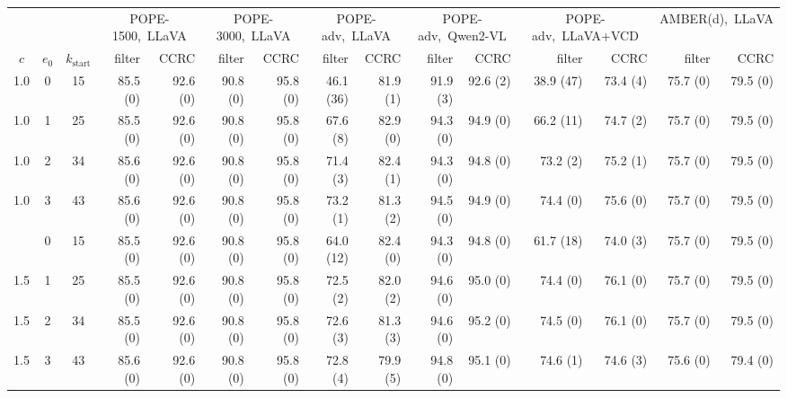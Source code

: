 \begin{tabular}{cccrrrrrrrrrrrr}
\toprule
 & & & \multicolumn{2}{c}{POPE-1500,~LLaVA} & \multicolumn{2}{c}{POPE-3000,~LLaVA} & \multicolumn{2}{c}{POPE-adv,~LLaVA} & \multicolumn{2}{c}{POPE-adv,~Qwen2-VL} & \multicolumn{2}{c}{POPE-adv,~LLaVA+VCD} & \multicolumn{2}{c}{AMBER(d),~LLaVA}\\
\cmidrule(lr){4-5}\cmidrule(lr){6-7}\cmidrule(lr){8-9}\cmidrule(lr){10-11}\cmidrule(lr){12-13}\cmidrule(lr){14-15}
$c$ & $e_0$ & $k_{\mathrm{start}}$ & filter & CCRC & filter & CCRC & filter & CCRC & filter & CCRC & filter & CCRC & filter & CCRC\\
\midrule
1.0 & 0 & 15 & 85.5 (0) & 92.6 (0) & 90.8 (0) & 95.8 (0) & 46.1 (36) & 81.9 (1) & 91.9 (3) & 92.6 (2) & 38.9 (47) & 73.4 (4) & 75.7 (0) & 79.5 (0)\\
1.0 & 1 & 25 & 85.5 (0) & 92.6 (0) & 90.8 (0) & 95.8 (0) & 67.6 (8) & 82.9 (0) & 94.3 (0) & 94.9 (0) & 66.2 (11) & 74.7 (2) & 75.7 (0) & 79.5 (0)\\
1.0 & 2 & 34 & 85.6 (0) & 92.6 (0) & 90.8 (0) & 95.8 (0) & 71.4 (3) & 82.4 (1) & 94.3 (0) & 94.8 (0) & 73.2 (2) & 75.2 (1) & 75.7 (0) & 79.5 (0)\\
1.0 & 3 & 43 & 85.6 (0) & 92.6 (0) & 90.8 (0) & 95.8 (0) & 73.2 (1) & 81.3 (2) & 94.5 (0) & 94.9 (0) & 74.4 (0) & 75.6 (0) & 75.7 (0) & 79.5 (0)\\
\addlinespace
1.5 & 0 & 15 & 85.5 (0) & 92.6 (0) & 90.8 (0) & 95.8 (0) & 64.0 (12) & 82.4 (0) & 94.3 (0) & 94.8 (0) & 61.7 (18) & 74.0 (3) & 75.7 (0) & 79.5 (0)\\
1.5 & 1 & 25 & 85.5 (0) & 92.6 (0) & 90.8 (0) & 95.8 (0) & 72.5 (2) & 82.0 (2) & 94.6 (0) & 95.0 (0) & 74.4 (0) & 76.1 (0) & 75.7 (0) & 79.5 (0)\\
1.5 & 2 & 34 & 85.5 (0) & 92.6 (0) & 90.8 (0) & 95.8 (0) & 72.6 (3) & 81.3 (3) & 94.6 (0) & 95.2 (0) & 74.5 (0) & 76.1 (0) & 75.7 (0) & 79.5 (0)\\
1.5 & 3 & 43 & 85.6 (0) & 92.6 (0) & 90.8 (0) & 95.8 (0) & 72.8 (4) & 79.9 (5) & 94.8 (0) & 95.1 (0) & 74.6 (1) & 74.6 (3) & 75.6 (0) & 79.4 (0)\\
\bottomrule
\end{tabular}
